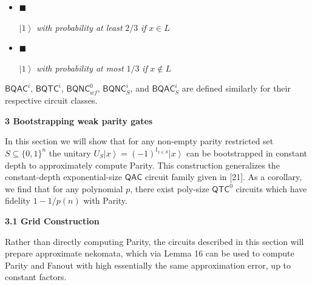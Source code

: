 \documentclass[10pt,a4paper]{article}
\begin{document}
\begin{itemize}


\item[] 
$\blacksquare$ 


$\left|1\right\rangle$\emph{ with probability at least }$2/3$\emph{ if }$x\in L$\emph{}\par





\item[] 
$\blacksquare$ 


$\left|1\right\rangle$\emph{ with probability at most }$1/3$\emph{ if }$x\not\in L$\emph{}\par





\end{itemize}






${\mathsf{BQAC}}^{i}$, ${\mathsf{BQTC}}^{i}$, ${\mathsf{BQNC}}^{0}_{wf}$, ${\mathsf{BQNC}}^{i}_{S}$, and ${\mathsf{BQAC}}^{i}_{S}$ are defined similarly for their respective circuit classes.\par






\par\medskip\noindent\textbf{
3 Bootstrapping weak parity gates}\par




In this section we will show that for any non-empty parity restricted set $S\subseteq\{0,1\}^{n}$ the unitary $U_{S}\left|x\right\rangle=(-1)^{\mathbb{I}_{x\in S}}\left|x\right\rangle$ can be bootstrapped in constant depth to approximately compute Parity. This construction generalizes the constant-depth exponential-size ${\mathsf{QAC}}$ circuit family given in [21]. As a corollary, we find that for any polynomial $p$, there exist poly-size ${\mathsf{QTC}}^{0}$ circuits which have fidelity $1-1/p(n)$ with Parity.\par




\par\medskip\noindent\textbf{
3.1 Grid Construction}\par




Rather than directly computing Parity, the circuits described in this section will prepare approximate nekomata, which via Lemma 16 can be used to compute Parity and Fanout with high essentially the same approximation error, up to constant factors.\par
\end{document}
